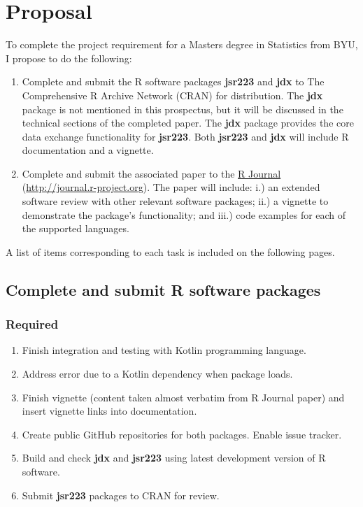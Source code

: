 \chapter{Proposal}

To complete the project requirement for a Masters degree in Statistics from BYU, I propose to do the following:

\begin{enumerate}
\item Complete and submit the R software packages \textbf{jsr223} and \textbf{jdx} to The Comprehensive R Archive Network (CRAN) for distribution. The \textbf{jdx} package is not mentioned in this prospectus, but it will be discussed in the technical sections of the completed paper. The \textbf{jdx} package provides the core data exchange functionality for \textbf{jsr223}. Both \textbf{jsr223} and \textbf{jdx} will include R documentation and a vignette.

\item Complete and submit the associated paper to the \href{http://journal.r-project.org}{R Journal} \\ (\href{http://journal.r-project.org}{http://journal.r-project.org}). The paper will include: i.) an extended software review with other relevant software packages; ii.) a vignette to demonstrate the package's functionality; and iii.) code examples for each of the supported languages.
\end{enumerate}

\noindent A list of items corresponding to each task is included on the following pages.

\clearpage
\section{Complete and submit R software packages}

\subsection{Required}

\begin{enumerate}
\item Finish integration and testing with Kotlin programming language.

\item Address error due to a Kotlin dependency when package loads.

\item Finish vignette (content taken almost verbatim from R Journal paper) and insert vignette links into documentation.

\item Create public GitHub repositories for both packages. Enable issue tracker.

\item Build and check \textbf{jdx} and \textbf{jsr223} using latest development version of R software.

\item Submit \textbf{jsr223} packages to CRAN for review.
\end{enumerate}

